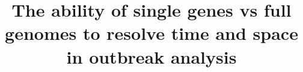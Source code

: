 \documentclass{bmcart}
\begin{document}
\begin{frontmatter}

\begin{fmbox}


\title{The ability of single genes vs full genomes to resolve time and space in outbreak analysis}


\author[
   addressref={aff1,aff2},                   %
   corref={aff1},                       %
   email={gytisdudas@gmail.com}   %
]{ }
\author[
   addressref={aff1},
   email={trevor@bedford.io}
]{ }


\address[id=aff1]{%
  , %
  ,                     %
  ,                              %
}
\address[id=aff2]{%
  ,
  ,
  ,
}


\end{fmbox}
\end{frontmatter}
\end{document}
